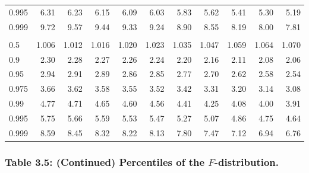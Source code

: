 \documentclass[]{article}
\begin{document}
\begin{table}[H]
\begin{tabular}{lrrrrrrrrrr}
\hspace{1em}0.995 & 6.31 & 6.23 & 6.15 & 6.09 & 6.03 & 5.83 & 5.62 & 5.41 & 5.30 & 5.19\\
\hspace{1em}0.999 & 9.72 & 9.57 & 9.44 & 9.33 & 9.24 & 8.90 & 8.55 & 8.19 & 8.00 & 7.81\\
\addlinespace[0.3em]
\multicolumn{11}{l}{\textbf{$k_2=10$}}\\
\hspace{1em}0.5 & 1.006 & 1.012 & 1.016 & 1.020 & 1.023 & 1.035 & 1.047 & 1.059 & 1.064 & 1.070\\
\hspace{1em}0.9 & 2.30 & 2.28 & 2.27 & 2.26 & 2.24 & 2.20 & 2.16 & 2.11 & 2.08 & 2.06\\
\hspace{1em}0.95 & 2.94 & 2.91 & 2.89 & 2.86 & 2.85 & 2.77 & 2.70 & 2.62 & 2.58 & 2.54\\
\hspace{1em}0.975 & 3.66 & 3.62 & 3.58 & 3.55 & 3.52 & 3.42 & 3.31 & 3.20 & 3.14 & 3.08\\
\hspace{1em}0.99 & 4.77 & 4.71 & 4.65 & 4.60 & 4.56 & 4.41 & 4.25 & 4.08 & 4.00 & 3.91\\
\hspace{1em}0.995 & 5.75 & 5.66 & 5.59 & 5.53 & 5.47 & 5.27 & 5.07 & 4.86 & 4.75 & 4.64\\
\hspace{1em}0.999 & 8.59 & 8.45 & 8.32 & 8.22 & 8.13 & 7.80 & 7.47 & 7.12 & 6.94 & 6.76\\
\bottomrule
\end{tabular}
\end{table}

\hypertarget{table-3.5-continued-percentiles-of-the-f-distribution.}{%
\subsubsection{\texorpdfstring{Table 3.5: (Continued) Percentiles of the
\(F\)-distribution.}{Table 3.5: (Continued) Percentiles of the F-distribution.}}\label{table-3.5-continued-percentiles-of-the-f-distribution.}}
\end{document}
